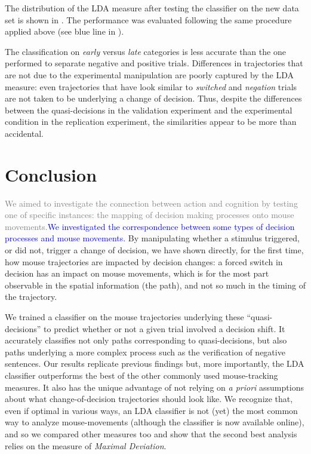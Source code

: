 \documentclass[draft]{article}
\newcommand{\changeEC}[2]{{\footnotesize\textcolor{gray}{#1}}\textcolor{blue}{#2}}
\begin{document}
The distribution of the LDA measure after testing the classifier on the new data set is shown in . The performance was evaluated following the same procedure applied above (see blue line in ). 

The classification on \emph{early} versus \emph{late} categories is less accurate than the one performed to separate negative and positive trials.
Differences in trajectories that are not due to the experimental manipulation are poorly captured by the LDA measure: even trajectories that  have look similar to \emph{switched} and \emph{negation} trials are not taken to be underlying a change of decision. 
Thus, despite the differences between the quasi-decisions in the validation experiment and the experimental condition in the replication experiment, the similarities appear to be more than accidental.

\section{Conclusion}

\changeEC{We aimed to investigate the connection between action and cognition by testing one of  specific instances: the mapping of decision making processes onto mouse movements.}{We investigated the correspondence between some types of decision processes and mouse movements.}
By manipulating whether a stimulus triggered, or did not, trigger a change of decision, we have shown directly, for the first time, how mouse trajectories are impacted by decision changes: a forced switch in decision has an impact on mouse movements, which is for the most part observable in the spatial information (the path), and not so much in the timing of the trajectory. 

We trained a classifier on the mouse trajectories underlying these ``quasi-decisions'' to predict whether or not a given trial involved a decision shift. It accurately classifies not only paths corresponding to quasi-decisions, but also paths underlying a more complex process such as the verification of negative sentences. Our results replicate previous findings but, more importantly, the LDA classifier outperforms the best of the other commonly used mouse-tracking measures. It also has the unique advantage of not relying on \emph{a priori} assumptions about what change-of-decision trajectories should look like. We recognize that, even if optimal in various ways, an LDA classifier is not (yet) the most common way to analyze mouse-movements (although the classifier is now available online), and so we compared other measures too and show that the second best analysis relies on the measure of \emph{Maximal Deviation}.
\end{document}
